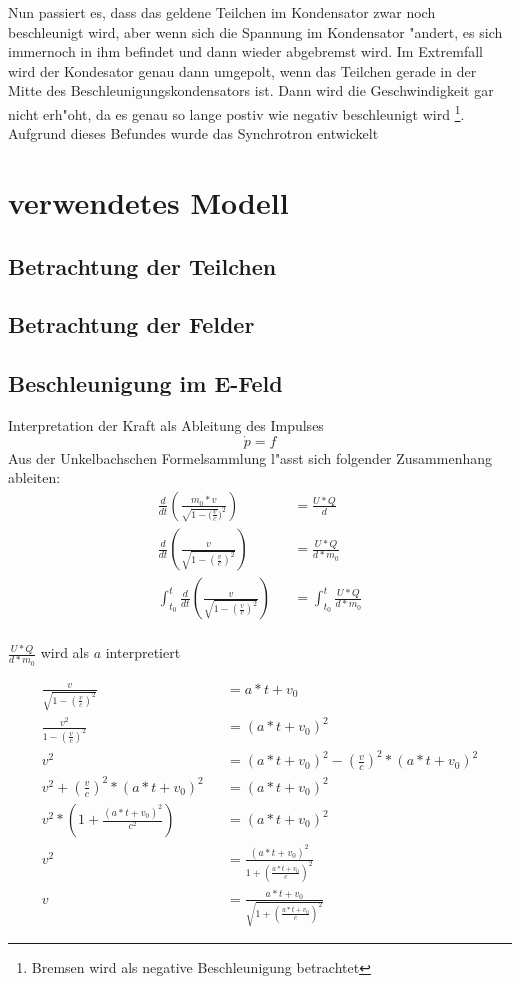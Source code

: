 \documentclass[14pt, a4paper]{report}
\begin{document}
Nun passiert es,
dass das geldene Teilchen im Kondensator zwar noch beschleunigt wird, aber wenn sich die
Spannung im Kondensator "andert, es sich immernoch in ihm befindet und dann wieder 
abgebremst wird. Im Extremfall wird der Kondesator genau dann umgepolt, wenn das 
Teilchen gerade in der Mitte des Beschleunigungskondensators ist. Dann wird die 
Geschwindigkeit gar nicht erh"oht, da es genau so lange postiv wie negativ beschleunigt 
wird \footnote{Bremsen wird als negative Beschleunigung betrachtet}.
Aufgrund dieses Befundes wurde das Synchrotron entwickelt 

\chapter{verwendetes Modell}
\section{Betrachtung der Teilchen}
\section{Betrachtung der Felder}
\section{Beschleunigung im E-Feld}
Interpretation der Kraft als Ableitung des Impulses
\begin{equation}
\dot{p} = f 
\end{equation}
Aus der Unkelbachschen Formelsammlung l"asst sich folgender Zusammenhang ableiten:
\begin{eqnarray}
\frac{d}{dt} (\frac{m_0 * v}{\sqrt{1 - (\frac{v}{c}})^2}) && = \frac{U * Q}{d} \\
\frac{d}{dt} (\frac{v}{\sqrt{1 - (\frac{v}{c})^2}}) && = \frac{U * Q}{d * m_0} \\
\int_{t_0}^t \frac{d}{dt} (\frac{v}{\sqrt{1 - (\frac{v}{c})^2}}) 
    && = \int_{t_0}^t \frac{U * Q}{d * m_0} \\
\end{eqnarray}
\begin{center}
$ \frac{U * Q}{d * m_0} $ wird als $ a $ interpretiert
\end{center}
\begin{eqnarray}
\frac{v}{\sqrt{1 - (\frac{v}{c})^2}} && = a * t + v_0 \\
\frac{v^2}{1 - (\frac{v}{c})^2} && = (a * t + v_0 )^2 \\
v^2  && = (a * t + v_0)^2 - (\frac{v}{c})^2 * (a * t + v_0)^2\\
v^2 + (\frac{v}{c})^2 * (a * t + v_0)^2 && = (a * t + v_0)^2 \\
v^2 * (1 + \frac{(a * t + v_0)^2}{c^2}) &&  = (a * t + v_0)^2 \\
v^2 && = \frac{(a * t + v_0)^2}{1 + (\frac{a * t + v_0}{c})^2} \\ 
v && = \frac{a * t + v_0}{\sqrt{1 + (\frac{a * t + v_0}{c})^2}}
\end{eqnarray}
\end{document}
